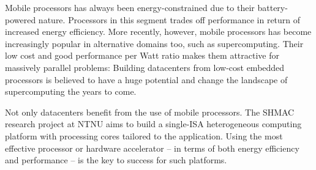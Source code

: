 
Mobile processors has always been energy-constrained due to their
battery-powered nature. Processors in this segment trades off performance in
return of increased energy efficiency. More recently, however, mobile processors
has become increasingly popular in alternative domains too, such as
supercomputing. Their low cost and good performance per Watt ratio makes them
attractive for massively parallel problems: Building datacenters from low-cost
embedded processors is believed to have a huge potential and change the
landscape of supercomputing the years to come.


Not only datacenters benefit from the use of mobile processors. The SHMAC
research project at NTNU aims to build a single-ISA heterogeneous computing
platform with processing cores tailored to the application. Using the most
effective processor or hardware accelerator -- in terms of both energy efficiency
and performance -- is the key to success for such platforms.



